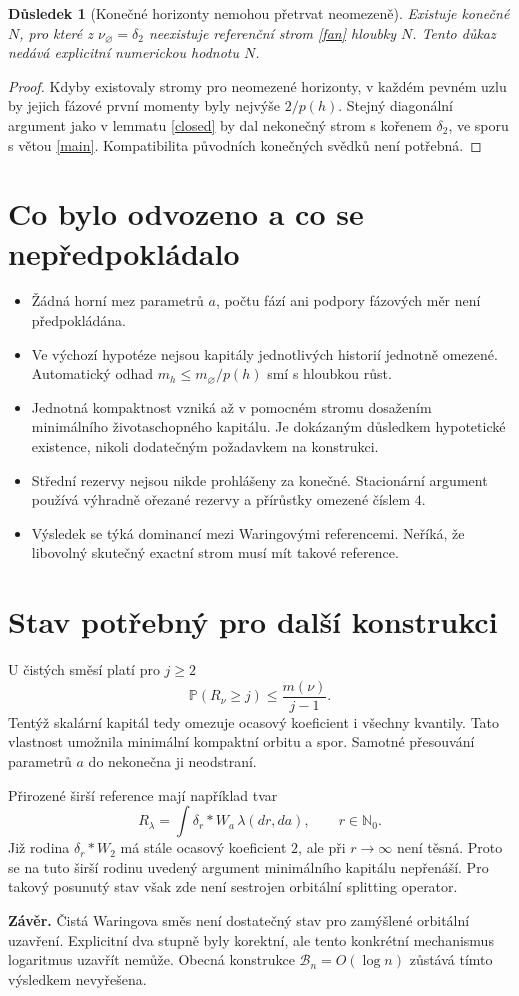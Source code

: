 \documentclass[11pt,a4paper]{article}
\newtheorem{corollary}[theorem]{Důsledek}
\newcommand{\Prb}{\mathbb P}
\begin{document}
\begin{corollary}[Konečné horizonty nemohou přetrvat neomezeně]
Existuje konečné $N$, pro které z $\nu_\varnothing=\delta_2$
neexistuje referenční strom \eqref{fan} hloubky $N$.
Tento důkaz nedává explicitní numerickou hodnotu $N$.
\end{corollary}
\begin{proof}
Kdyby existovaly stromy pro neomezené horizonty, v každém pevném
uzlu by jejich fázové první momenty byly nejvýše $2/p(h)$.
Stejný diagonální argument jako v lemmatu \ref{closed} by dal
nekonečný strom s kořenem $\delta_2$, ve sporu s větou \ref{main}.
Kompatibilita původních konečných svědků není potřebná.
\end{proof}

\section{Co bylo odvozeno a co se nepředpokládalo}
\begin{itemize}
\item Žádná horní mez parametrů $a$, počtu fází ani podpory
fázových měr není předpokládána.
\item Ve výchozí hypotéze nejsou kapitály jednotlivých historií
jednotně omezené. Automatický odhad $m_h\le m_\varnothing/p(h)$
smí s hloubkou růst.
\item Jednotná kompaktnost vzniká až v pomocném stromu dosažením
minimálního životaschopného kapitálu. Je dokázaným důsledkem
hypotetické existence, nikoli dodatečným požadavkem na konstrukci.
\item Střední rezervy nejsou nikde prohlášeny za konečné.
Stacionární argument používá výhradně ořezané rezervy a přírůstky
omezené číslem $4$.
\item Výsledek se týká dominancí mezi Waringovými referencemi.
Neříká, že libovolný skutečný exactní strom musí mít takové reference.
\end{itemize}

\section{Stav potřebný pro další konstrukci}
U čistých směsí platí pro $j\ge2$
\[
\Prb(R_\nu\ge j)\le\frac{m(\nu)}{j-1}.
\]
Tentýž skalární kapitál tedy omezuje ocasový koeficient i všechny
kvantily. Tato vlastnost umožnila minimální kompaktní orbitu a spor.
Samotné přesouvání parametrů $a$ do nekonečna ji neodstraní.

Přirozené širší reference mají například tvar
\[
R_\lambda=\int\delta_r*W_a\,\lambda(dr,da),\qquad r\in\mathbb N_0.
\]
Již rodina $\delta_r*W_2$ má stále ocasový koeficient $2$, ale při
$r\to\infty$ není těsná. Proto se na tuto širší rodinu uvedený
argument minimálního kapitálu nepřenáší. Pro takový posunutý stav
však zde není sestrojen orbitální splitting operator.

\medskip
\noindent\textbf{Závěr.}
Čistá Waringova směs není dostatečný stav pro zamýšlené orbitální
uzavření. Explicitní dva stupně byly korektní, ale tento konkrétní
mechanismus logaritmus uzavřít nemůže. Obecná konstrukce
$\mathcal B_n=O(\log n)$ zůstává tímto výsledkem nevyřešena.
\end{document}
